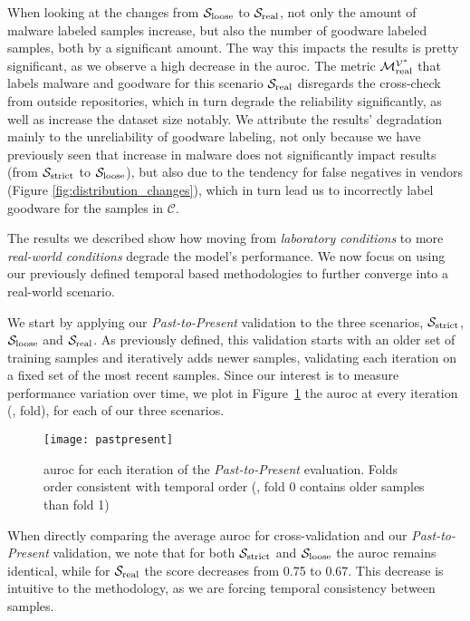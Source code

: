 When looking at the changes from $\mathcal{S}_{\mathrm{loose}}$ to $\mathcal{S}_{\mathrm{real}}$, not only the amount of malware labeled samples increase, but also the number of goodware labeled samples, both by a significant amount. 
The way this impacts the results is pretty significant, as we observe a high decrease in the \gls{auroc}.
The metric $\mathcal{M}_{\mathrm{real}}^{\mathcal{V}^*}$ that labels malware and goodware for this scenario $\mathcal{S}_{\mathrm{real}}$ disregards the cross-check from outside repositories, which in turn degrade the reliability significantly, as well as increase the dataset size notably.
We attribute the results' degradation mainly to the unreliability of goodware labeling, not only because we have previously seen that increase in malware does not significantly impact results (from $\mathcal{S}_{\mathrm{strict}}$ to $\mathcal{S}_{\mathrm{loose}}$), but also due to the tendency for false negatives in vendors (Figure \ref{fig:distribution_changes}), which in turn lead us to incorrectly label goodware for the samples in $\mathcal{C}$.

The results we described show how moving from \textit{laboratory conditions} to more \textit{real-world conditions} degrade the model's performance. We now focus on using our previously defined temporal based methodologies to further converge into a real-world scenario.

\medskip

We start by applying our \textit{Past-to-Present} validation to the three scenarios, $\mathcal{S}_{\mathrm{strict}}$, $\mathcal{S}_{\mathrm{loose}}$ and $\mathcal{S}_{\mathrm{real}}$.
As previously defined, this validation starts with an older set of training samples and iteratively adds newer samples, validating each iteration on a fixed set of the most recent samples.
Since our interest is to measure performance variation over time, we plot in Figure~\ref{fig:pastpresent} the \gls{auroc} at every iteration (\ie, fold), for each of our three scenarios.

\begin{figure}[!h]
	\centering
	\texttt{[image: pastpresent]}
	\caption{\gls{auroc} for each iteration of the \textit{Past-to-Present} evaluation. Folds order consistent with temporal order (\ie, fold 0 contains older samples than fold 1)}
	\label{fig:pastpresent}
\end{figure}

When directly comparing the average \gls{auroc} for cross-validation and our \textit{Past-to-Present} validation, we note that for both $\mathcal{S}_{\mathrm{strict}}$ and $\mathcal{S}_{\mathrm{loose}}$ the \gls{auroc} remains identical, while for $\mathcal{S}_{\mathrm{real}}$ the score decreases from 0.75 to 0.67.
This decrease is intuitive to the methodology, as we are forcing temporal consistency between samples.

